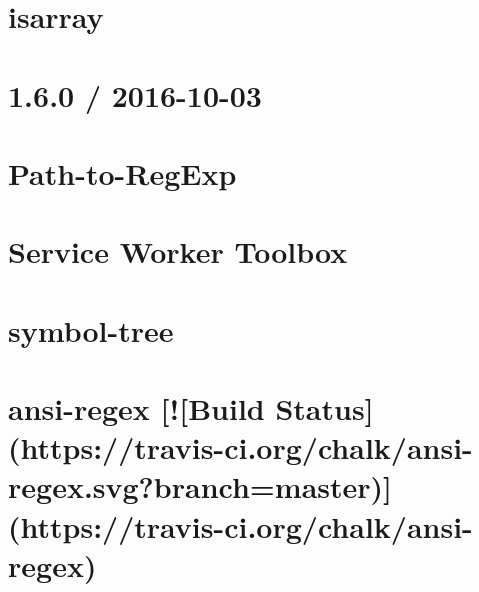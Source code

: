 \documentclass[twoside]{book}
\newcommand{\+}{\discretionary{\mbox{\scriptsize$\hookleftarrow$}}{}{}}
\begin{document}
\chapter{isarray}
\label{md__c_1_workspace_demo_src_main_script_node_modules_sw-toolbox_node_modules_isarray__r_e_a_d_m_e}

\chapter{1.6.0 / 2016-\/10-\/03}
\label{md__c_1_workspace_demo_src_main_script_node_modules_sw-toolbox_node_modules_path-to-regexp__history}

\chapter{Path-\/to-\/\+Reg\+Exp}
\label{md__c_1_workspace_demo_src_main_script_node_modules_sw-toolbox_node_modules_path-to-regexp__readme}

\chapter{Service Worker Toolbox}
\label{md__c_1_workspace_demo_src_main_script_node_modules_sw-toolbox__r_e_a_d_m_e}

\chapter{symbol-\/tree}
\label{md__c_1_workspace_demo_src_main_script_node_modules_symbol-tree__r_e_a_d_m_e}

\chapter{ansi-\/regex \mbox{[}!\mbox{[}Build Status\mbox{]}(https\+://travis-\/ci.org/chalk/ansi-\/regex.svg?branch=master)\mbox{]}(https\+://travis-\/ci.org/chalk/ansi-\/regex)}
\label{md__c_1_workspace_demo_src_main_script_node_modules_table_node_modules_ansi-regex_readme}

\end{document}
